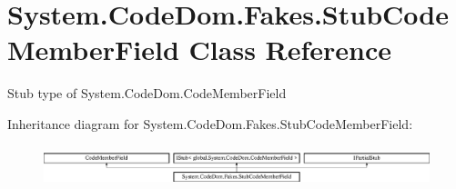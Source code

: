 \hypertarget{class_system_1_1_code_dom_1_1_fakes_1_1_stub_code_member_field}{\section{System.\-Code\-Dom.\-Fakes.\-Stub\-Code\-Member\-Field Class Reference}
\label{class_system_1_1_code_dom_1_1_fakes_1_1_stub_code_member_field}
}


Stub type of System.\-Code\-Dom.\-Code\-Member\-Field 


Inheritance diagram for System.\-Code\-Dom.\-Fakes.\-Stub\-Code\-Member\-Field\-:\begin{figure}[H]
\begin{center}
\leavevmode
\includegraphics[height=1.177708cm]{class_system_1_1_code_dom_1_1_fakes_1_1_stub_code_member_field}
\end{center}
\end{figure}
